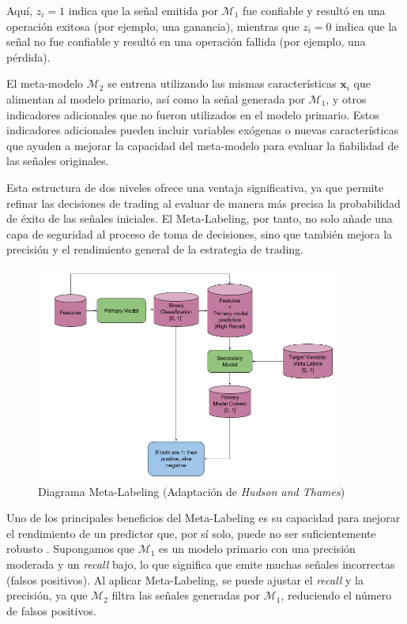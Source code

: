 \documentclass[a4paper,12pt, twoside]{report}
\begin{document}
Aquí, $z_i = 1$ indica que la señal emitida por $\mathcal{M}_1$ fue confiable y 
resultó en una operación exitosa (por ejemplo, una ganancia), mientras que $z_i = 0$ 
indica que la señal no fue confiable y resultó en una operación fallida (por ejemplo, 
una pérdida).

El meta-modelo $\mathcal{M}_2$ se entrena utilizando las mismas características 
$\mathbf{x}_i$ que alimentan al modelo primario, así como la señal generada por 
$\mathcal{M}_1$, y otros indicadores adicionales que no fueron utilizados en el
modelo primario. Estos indicadores adicionales pueden incluir variables exógenas 
o nuevas características que ayuden a mejorar la capacidad del meta-modelo para 
evaluar la fiabilidad de las señales originales.

Esta estructura de dos niveles ofrece una ventaja significativa, ya que permite 
refinar las decisiones de trading al evaluar de manera más precisa la 
probabilidad de éxito de las señales iniciales. El Meta-Labeling, por tanto, 
no solo añade una capa de seguridad al proceso de toma de decisiones, sino 
que también mejora la precisión y el rendimiento general de la estrategia de trading.

\begin{figure}[H]
    \centering
    \includegraphics[width=0.9\textwidth]{./figures/meta_labeling.png}
    \caption{Diagrama Meta-Labeling (Adaptación de \textit{Hudson and Thames})}
    \label{fig:meta_labeling_diagram}
\end{figure}

Uno de los principales beneficios del Meta-Labeling es su capacidad para mejorar 
el rendimiento de un predictor que, por sí solo, puede no ser suficientemente 
robusto \cite{does_meta_labeling_add}. Supongamos que $\mathcal{M}_1$ es un modelo 
primario con una precisión moderada y un \textit{recall} bajo, lo que significa que 
emite muchas señales incorrectas (falsos positivos). Al aplicar Meta-Labeling, se 
puede ajustar el \textit{recall} y la precisión, ya que $\mathcal{M}_2$ filtra las 
señales generadas por $\mathcal{M}_1$, reduciendo el número de falsos positivos.
\end{document}

